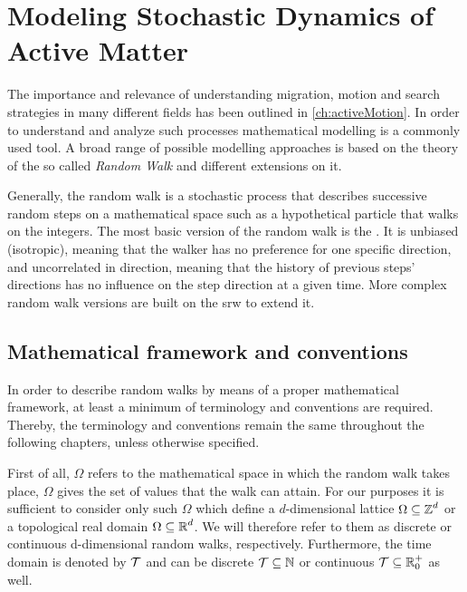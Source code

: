\chapter{Modeling Stochastic Dynamics of Active Matter}\label{ch:modelingActiveMatter}
The importance and relevance of understanding migration, motion and search strategies in many different fields has been outlined in \autoref{ch:activeMotion}. In order to understand and analyze such processes mathematical modelling is a commonly used tool. A broad range of possible modelling approaches is based on the theory of the so called \textit{Random Walk} and different extensions on it.

Generally, the random walk is a stochastic process that describes successive random steps on a mathematical space such as a hypothetical particle that walks on the integers. The most basic version of the random walk is the . It is unbiased (isotropic), meaning that the walker has no preference for one specific direction, and uncorrelated in direction, meaning that the history of previous steps' directions has no influence on the step direction at a given time. More complex random walk versions are built on the \ac{srw} to extend it.

\section{Mathematical framework and conventions}

In order to describe random walks by means of a proper mathematical framework, at least a minimum of terminology and conventions are required. Thereby, the terminology and conventions remain the same throughout the following chapters, unless otherwise specified.

First of all, $\Omega$ refers to the mathematical space in which the random walk takes place, \ie $\Omega$ gives the set of values that the walk can attain. For our purposes it is sufficient to consider only such $\Omega$ which define a $d$-dimensional lattice $\Omega \subseteq \operatorname{\mathbb{Z}}^d$ or a topological real domain $\Omega \subseteq \operatorname{\mathbb{R}}^d$. We will therefore refer to them as discrete or continuous d-dimensional random walks, respectively. Furthermore, the time domain is denoted by $\mathcal{T}$ and can be discrete $\mathcal{T} \subseteq \operatorname{\mathbb{N}}$ or continuous $\mathcal{T} \subseteq \operatorname{\mathbb{R}}^+_0$ as well.

